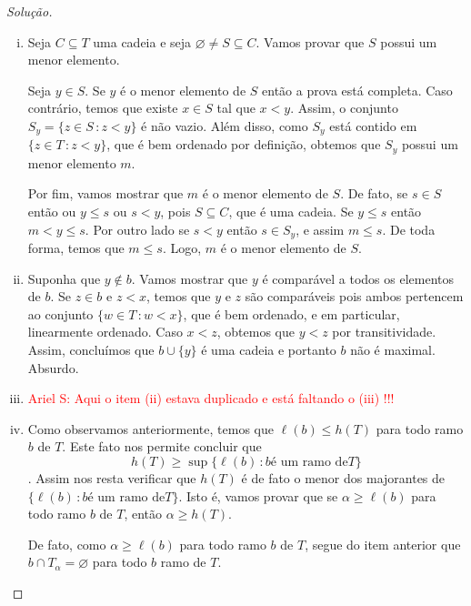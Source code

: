 \documentclass[a4paper]{article}
\begin{document}
  \begin{proof}[Solução]\hfill
    \begin{enumerate}[(i)]
      \item  Seja \(C\subseteq T\) uma cadeia e seja
        \(\varnothing\not = S\subseteq C\). Vamos provar que \(S\) possui um menor
        elemento.

        Seja \(y\in S\). Se \(y\) é o menor elemento de \(S\) então a prova está
        completa. Caso contrário, temos que existe \(x\in S\) tal que \(x<y\). Assim,
         o conjunto \(S_{y} =\{z\in S\,\colon z<y\}\) é não vazio. Além disso, como
         \(S_y\) está contido em \(\{z\in T\,\colon z<y\}\), que é bem ordenado por
         definição, obtemos que \(S_y\) possui um menor elemento \(m\).

         Por fim, vamos mostrar que \(m\) é o menor elemento de \(S\). De fato, se
         \(s\in S\) então ou \(y \leq s\) ou \(s<y\), pois \(S\subseteq C\), que é uma cadeia.
         Se \(y \leq s\) então \(m<y\leq s\). Por outro lado se
         \(s<y\) então \(s\in S_{y}\), e assim \(m\leq s\). De toda forma, temos que
         \(m\leq s\). Logo,  \(m\) é o menor elemento de \(S\).

       \item Suponha que \(y\not\in b\). Vamos mostrar que \(y\) é comparável
        a todos os elementos de \(b\). Se \(z\in b\) e \(z < x\), temos que
        \(y\) e \(z\) são comparáveis pois ambos pertencem ao conjunto \(\{w\in
        T\,\colon w< x \}\), que é bem ordenado, e em particular, linearmente
        ordenado. Caso \(x<z\), obtemos que \(y<z\) por transitividade. Assim,
        concluímos que \(b\cup\{y\}\) é uma cadeia e portanto \(b\) não é
        maximal. Absurdo.

        \item \textcolor{red}{Ariel S: Aqui o item (ii) estava duplicado e está
            faltando o (iii) !!!}
        
      \item Como observamos anteriormente, temos que  \(\ell (b)\leq h(T)\) para
        todo ramo \(b\) de \(T\). Este fato nos permite concluir que
        \[h(T)\geq\sup\{\ell(b)\,\colon b \text{é um ramo de} T\}\].
        Assim nos resta verificar que \(h(T)\) é de fato o menor dos majorantes
         de \(\{\ell(b)\,\colon b \text{é um ramo de} T\}\). Isto é, vamos
         provar que se \(\alpha\geq  \ell (b)\)
        para todo ramo \(b\) de \(T\), então \(\alpha\geq h(T)\).

        De fato, como \(\alpha\geq \ell (b)\) para todo ramo \(b\) de \(T\),
         segue do item anterior que \(b\cap T_\alpha=\varnothing\)  para
         todo \(b\)  ramo de \(T\).


\end{enumerate}
\end{proof}
\end{document}
